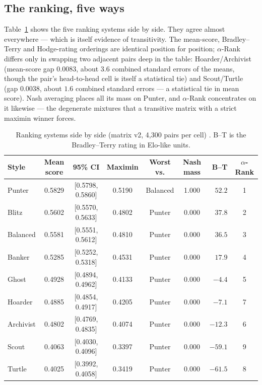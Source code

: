 \documentclass[11pt]{article}
\begin{document}
\subsection{The ranking, five ways}

Table~\ref{tab:ranking} shows the five ranking systems side by side. They agree almost
everywhere --- which is itself evidence of transitivity. The mean-score, Bradley--Terry and
Hodge-rating orderings are identical position for position; $\alpha$-Rank differs only in
swapping two adjacent pairs deep in the table: Hoarder/Archivist (mean-score gap $0.0083$,
about $3.6$ combined standard errors of the means, though the pair's head-to-head cell is
itself a statistical tie) and Scout/Turtle (gap $0.0038$, about $1.6$ combined standard errors
--- a statistical tie in mean score). Nash averaging places all its mass
on Punter, and $\alpha$-Rank concentrates on it likewise --- the degenerate mixtures that a
transitive matrix with a strict maximin winner forces.

\begin{table}[t]
\centering
\caption{Ranking systems side by side (matrix v2, 4{,}300 pairs per cell)
\cite{artifact}. B--T is the Bradley--Terry rating in Elo-like units.}
\label{tab:ranking}
\footnotesize
\begin{tabular}{@{}lcccccrc@{}}
\toprule
Style & Mean score & 95\% CI & Maximin & Worst vs. & Nash mass & B--T & $\alpha$-Rank \\
\midrule
Punter    & 0.5829 & [0.5798, 0.5860] & 0.5190 & Balanced & 1.000 & $52.2$ & 1 \\
Blitz     & 0.5602 & [0.5570, 0.5633] & 0.4802 & Punter   & 0.000 & $37.8$ & 2 \\
Balanced  & 0.5581 & [0.5551, 0.5612] & 0.4810 & Punter   & 0.000 & $36.5$ & 3 \\
Banker    & 0.5285 & [0.5252, 0.5318] & 0.4531 & Punter   & 0.000 & $17.9$ & 4 \\
Ghost     & 0.4928 & [0.4894, 0.4962] & 0.4133 & Punter   & 0.000 & $-4.4$ & 5 \\
Hoarder   & 0.4885 & [0.4854, 0.4917] & 0.4205 & Punter   & 0.000 & $-7.1$ & 7 \\
Archivist & 0.4802 & [0.4769, 0.4835] & 0.4074 & Punter   & 0.000 & $-12.3$ & 6 \\
Scout     & 0.4063 & [0.4030, 0.4096] & 0.3397 & Punter   & 0.000 & $-59.1$ & 9 \\
Turtle    & 0.4025 & [0.3992, 0.4058] & 0.3419 & Punter   & 0.000 & $-61.5$ & 8 \\
\bottomrule
\end{tabular}
\end{table}
\end{document}
